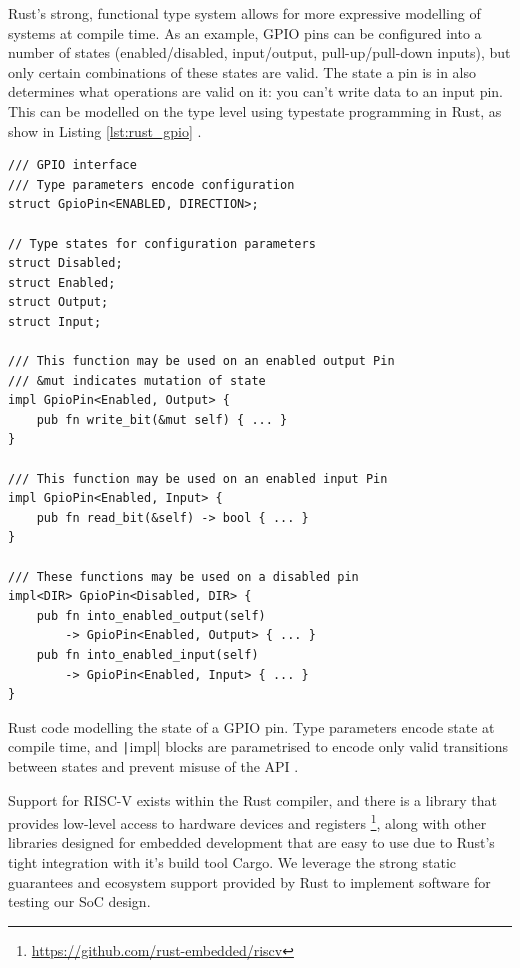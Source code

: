 Rust's strong, functional type system allows for more expressive modelling of systems at compile time. As an example, GPIO pins can be configured into a number of states (enabled/disabled, input/output, pull-up/pull-down inputs), but only certain combinations of these states are valid. The state a pin is in also determines what operations are valid on it: you can't write data to an input pin. This can be modelled on the type level using typestate programming in Rust, as show in Listing \ref{lst:rust_gpio} \cite{embedded_rust}.

\begin{listing}[h!]
    \vspace{0.5cm}
    \begin{verbatim}
/// GPIO interface
/// Type parameters encode configuration
struct GpioPin<ENABLED, DIRECTION>;

// Type states for configuration parameters
struct Disabled;
struct Enabled;
struct Output;
struct Input;

/// This function may be used on an enabled output Pin
/// &mut indicates mutation of state
impl GpioPin<Enabled, Output> {
    pub fn write_bit(&mut self) { ... }
}

/// This function may be used on an enabled input Pin
impl GpioPin<Enabled, Input> {
    pub fn read_bit(&self) -> bool { ... }
}

/// These functions may be used on a disabled pin
impl<DIR> GpioPin<Disabled, DIR> {
    pub fn into_enabled_output(self) 
        -> GpioPin<Enabled, Output> { ... }
    pub fn into_enabled_input(self) 
        -> GpioPin<Enabled, Input> { ... }
}
    \end{verbatim}
    \caption{Rust code modelling the state of a GPIO pin. Type parameters encode state at compile time, and \texttt|impl| blocks are parametrised to encode only valid transitions between states and prevent misuse of the API \cite{embedded_rust}.}
    \label{lst:rust_gpio}
\end{listing}

Support for RISC-V exists within the Rust compiler, and there is a  library that provides low-level access to hardware devices and registers \footnote{\url{https://github.com/rust-embedded/riscv}}, along with other libraries designed for embedded development that are easy to use due to Rust's tight integration with it's build tool Cargo. We leverage the strong static guarantees and ecosystem support provided by Rust to implement software for testing our SoC design.

